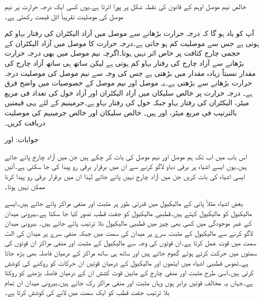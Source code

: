 خالص نیم موصل اوہم کے قانون کی نقطہ شکل پر پورا اترتا ہے۔یوں کسی ایک درجہ حرارت پر نیم موصل کی موصلیت تقریباً اٹل قیمت رکھتی ہے۔  

آپ کو یاد ہو گا کہ درجہ حرارت بڑھانے سے موصل میں آزاد الیکٹران کی رفتار بہاو کم ہوتی ہے جس سے موصلیت کم  ہو جاتی ہے۔درجہ حرارت کا موصل میں آزاد الیکٹران کے حجمی چارج کثافت پر خاص اثر نہیں ہوتا۔اگرچہ نیم موصل میں بھی درجہ حرارت بڑھانے سے آزاد چارج کی رفتار بہاو کم ہوتی ہے لیکن ساتھ ہی ساتھ آزاد چارج کی مقدار نسبتاً زیادہ مقدار میں بڑھتی ہے جس  کی وجہ سے نیم موصل کی  موصلیت درجہ حرارت بڑھانے سے بڑھتی ہے۔یہ موصل اور نیم موصل کے خصوصیات میں واضح فرق ہے۔
 درجہ حرارت پر خالص سلیکان میں آزاد الیکٹران اور آزاد خول کی تعداد  فی مربع میٹر، الیکٹران کی رفتار بہاو  جبکہ خول کی رفتار بہاو  ہے۔جرمینیم کے لئے یہی قیمتیں بالترتیب  فی مربع میٹر،  اور  ہیں۔ خالص سلیکان اور خالص جرمینیم کی موصلیت دریافت کریں۔

جوابات: اور 


اس باب میں اب تک ہم موصل اور نیم موصل کی بات کر چکے ہیں جن میں آزاد چارج پائے جاتے ہیں۔یوں ایسے اشیاء پر برقی دباو لاگو کرنے سے ان میں برقرار برقی رو پیدا کی جا سکتی ہے۔آئیں ایسی اشیاء کی بات کریں جن میں آزاد چارج نہیں پائے جاتے لہٰذا ان میں برقرار برقی رو پیدا کرنا ممکن نہیں ہوتا۔

بعض اشیاء مثلاً پانی  کے مالیکیول میں قدرتی طور پر مثبت اور منفی مراکز پائے جاتے  ہیں۔ایسے مالیکیول کو  مالیکیول کہتے ہیں۔قطببی مالیکیول کو جفت قطب تصور کیا جا سکتا ہے۔بیرونی میدان کے غیر موجودگی میں کسی بھی چیز میں قطببی مالیکیول بلا ترتیب پائے جاتے ہیں۔ بیرونی میدان  لاگو کرنے سے مالیکیول کے مثبت سرے پر میدان کی سمت میں جبکہ منفی سرے پر میدان کی الٹ سمت میں  قوت عمل کرتا ہے۔ان قوتوں کی وجہ سے مالیکیول کے مثبت اور منفی مراکز ان قوتوں کی سمتوں میں حرکت کرتے ہوئے گھوم جاتے ہیں اور ساتھ ہی ساتھ مراکز کے درمیان فاصلہ بھی بڑھ جاتا ہے۔ٹھوس قطببی اشیاء میں ایٹموں اور مالیکیول کے درمیان قوتیں ان حرکات کو روکنے کی کوشش کرتی ہیں۔اسی طرح مثبت اور منفی چارج کے مابین قوت کشش ان کے درمیان فاصلہ بڑھنے کو روکتا ہے۔جہاں یہ مخالف قوتیں برابر ہوں وہاں مثبت اور منفی مراکز رک جاتے ہیں۔بیرونی میدان ان تمام بلا ترتیب جفت قطب کو ایک سمت میں لانے کی کوشش کرتا ہے۔

